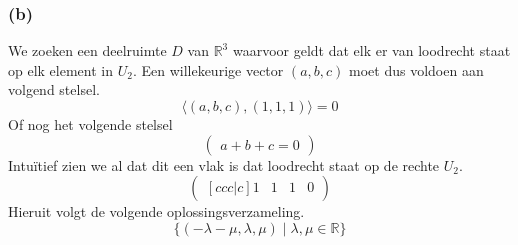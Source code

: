 \documentclass[lineaire_algebra_oplossingen.tex]{subfiles}
\begin{document}
\subsubsection*{(b)}
We zoeken een deelruimte $D$ van $\mathbb{R}^3$ waarvoor geldt dat elk er van loodrecht staat op elk element in $U_2$. Een willekeurige vector $(a,b,c)$ moet dus voldoen aan volgend stelsel.
\[
\langle (a,b,c),(1,1,1)\rangle = 0
\]
Of nog het volgende stelsel
\[
\begin{pmatrix}
a + b + c = 0 
\end{pmatrix}
\]
Intu\"itief zien we al dat dit een vlak is dat loodrecht staat op de rechte $U_2$.
\[
\begin{pmatrix}[ccc|c]
1 & 1 & 1 & 0 
\end{pmatrix}
\]
Hieruit volgt de volgende oplossingsverzameling.
\[
\{ (-\lambda - \mu , \lambda, \mu) \mid \lambda,\mu \in \mathbb{R}\}
\]
\end{document}
